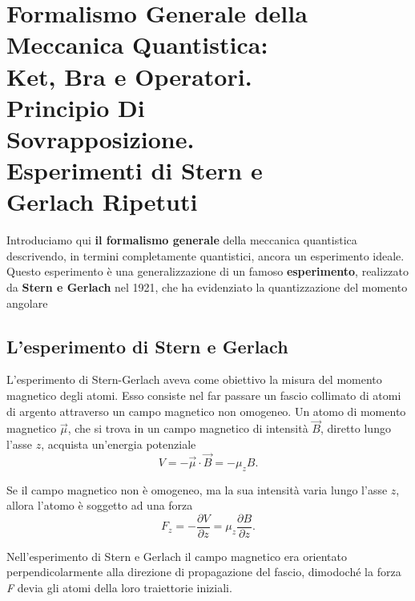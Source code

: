 \pagestyle{VS}
\chapter[Formalismo Generale della M.Q.]{Formalismo Generale della Meccanica Quantistica: \\Ket, Bra e Operatori.\\Principio Di\\ Sovrapposizione.\\ Esperimenti di Stern e\\ Gerlach Ripetuti}
 
Introduciamo qui \textbf{il formalismo generale} della meccanica quantistica descrivendo, in termini completamente quantistici, ancora un esperimento ideale. Questo esperimento è una generalizzazione di un famoso \textbf{esperimento}, realizzato da \textbf{Stern e Gerlach} nel 1921, che ha evidenziato la quantizzazione del momento angolare
 
\section{L'esperimento di Stern e Gerlach}
L'esperimento di Stern-Gerlach aveva come obiettivo la misura del momento magnetico degli atomi. Esso consiste nel far passare un fascio collimato di atomi di argento attraverso un campo magnetico non omogeneo. Un atomo di momento magnetico $\vec \mu$, che si trova in un campo magnetico di intensità $\vec B$, diretto lungo l'asse $z$, acquista un'energia potenziale
	\begin{equation}
		\boxed{
			V= -\vec \mu \cdot \vec B= -\mu_zB .
			}
	\end{equation} 

Se il campo magnetico non è omogeneo, ma la sua intensità varia lungo l'asse $z$, allora l'atomo è soggetto ad una forza
	\begin{equation}
		\boxed{			
			F_z= - \frac{\partial V}{\partial z}= \mu_z\frac{\partial B}{\partial z} .
			}
\end{equation}

Nell'esperimento di Stern e Gerlach il campo magnetico era orientato perpendicolarmente alla direzione di propagazione del fascio, dimodoché la forza \emph{F} devia gli atomi della loro traiettorie iniziali.\\

